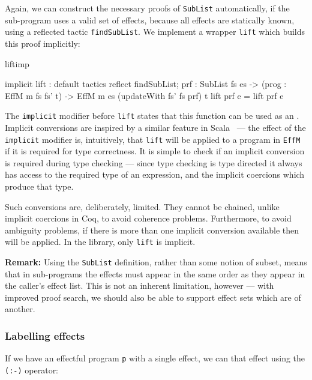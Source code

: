 \noindent
Again, we can construct the necessary proofs of \texttt{SubList} automatically,
if the sub-program uses a valid set of effects, because all effects are
statically known, using a reflected tactic \texttt{findSubList}. We implement
a wrapper \texttt{lift} which builds this proof implicitly:

\begin{SaveVerbatim}{liftimp}

implicit
lift : {default tactics { reflect findSubList; }
          prf : SubList fs es} ->
       (prog : EffM m fs fs' t) -> 
       EffM m es (updateWith fs' fs prf) t
lift {prf} e = lift prf e

\end{SaveVerbatim}

\noindent
The \texttt{implicit} modifier before \texttt{lift} states that this function
can be used as an . Implicit conversions are inspired
by a similar feature in Scala~\cite{Scala} --- the effect of the \texttt{implicit}
modifier is, intuitively, that \texttt{lift} will be applied to
a program in \texttt{EffM} if it is required for type correctness. It is
simple to check if an implicit conversion is required during type 
checking --- since type checking is type directed it always has access to the
required type of an expression, and the implicit coercions which produce
that type.

Such conversions are, deliberately, limited. They cannot be chained, unlike
implicit coercions in Coq, to avoid coherence problems. Furthermore, to avoid
ambiguity problems, if there is more than one implicit conversion available
then  will be applied. In the \Eff{} library, only \texttt{lift}
is implicit.

\textbf{Remark:} Using the \texttt{SubList} definition, rather than some notion
of subset, means that in sub-programs the effects must appear in the same order
as they appear in the caller's effect list. This is not an inherent limitation,
however --- with improved proof search, we should also be able to support
effect sets which are  of another.

\subsubsection{Labelling effects}

If we have an effectful program \texttt{p} with a single effect, we can 
 that effect using the \texttt{(:-)} operator:

